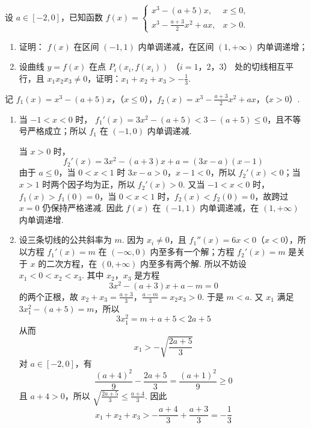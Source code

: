 \begin{problem}
设 \(a \in [-2,0]\)，已知函数 \(f(x) = \begin{cases}
x^3 - (a + 5)x, & x \leqslant 0,\\
x^3 - \frac{a + 3}{2}x^2 + ax, & x > 0.
\end{cases}\)
\begin{enumerate}
\item 证明： \( f(x) \) 在区间 \( (-1,1) \) 内单调递减，在区间 \( (1,+\infty) \) 内单调递增；
\item 设曲线 \( y = f(x) \) 在点 \( P_i(x_i, f(x_i)) \) （\(i = 1\)，\(2\)，\(3\)） 处的切线相互平行，且 \( x_{1}x_{2}x_{3} \neq 0 \)，证明：\( x_{1} + x_{2} + x_{3} > -\frac{1}{3} \).
\end{enumerate}
\end{problem}

\begin{solution}
记
\(f_1(x)=x^3-(a+5)x\)，（\(x\leqslant0\)），\(f_2(x)=x^3-\frac{a+3}{2}x^2+ax\)，（\(x>0\)）.
\begin{enumerate}
\item 当 \(-1<x<0\) 时，
\(f_1'(x)=3x^2-(a+5)<3-(a+5)\leqslant0\)，且不等号严格成立；所以 \(f_1\) 在 \((-1,0)\) 内单调递减.

当 \(x>0\) 时，
\[
f_2'(x)=3x^2-(a+3)x+a=(3x-a)(x-1)
\]
由于 \(a\leqslant0\)，当 \(0<x<1\) 时 \(3x-a>0\)，\(x-1<0\)，所以 \(f_2'(x)<0\)；当 \(x>1\) 时两个因子均为正，所以 \(f_2'(x)>0\). 又当 \(-1<x<0\) 时，\(f_1(x)>f_1(0)=0\)，当 \(0<x<1\) 时，\(f_2(x)<f_2(0)=0\)，故跨过 \(x=0\) 仍保持严格递减. 因此 \(f(x)\) 在 \((-1,1)\) 内单调递减，在 \((1,+\infty)\) 内单调递增.

\item 设三条切线的公共斜率为 \(m\). 因为 \(x_i\neq0\)，且
\(f_1''(x)=6x<0\)（\(x<0\)），所以方程 \(f_1'(x)=m\) 在
\((-\infty,0)\) 内至多有一个解；方程 \(f_2'(x)=m\) 是关于 \(x\) 的二次方程，在
\((0,+\infty)\) 内至多有两个解. 所以不妨设
\(x_1<0<x_2<x_3\). 其中 \(x_2\)，\(x_3\) 是方程
\[
3x^2-(a+3)x+a-m=0
\]
的两个正根，故
\(x_2+x_3=\frac{a+3}{3}\)，\(\frac{a-m}{3}=x_2x_3>0\).
于是 \(m<a\). 又 \(x_1\) 满足 \(3x_1^2-(a+5)=m\)，所以
\[
3x_1^2=m+a+5<2a+5
\]
从而
\[
x_1> -\sqrt{\frac{2a+5}{3}}
\]
对 \(a\in[-2,0]\)，有
\[
\frac{(a+4)^2}{9}-\frac{2a+5}{3}=\frac{(a+1)^2}{9}\geqslant0
\]
且 \(a+4>0\)，所以 \(\sqrt{\frac{2a+5}{3}}\leqslant\frac{a+4}{3}\). 因此
\[
x_1+x_2+x_3> -\frac{a+4}{3}+\frac{a+3}{3}=-\frac{1}{3}
\]
\end{enumerate}
\end{solution}

